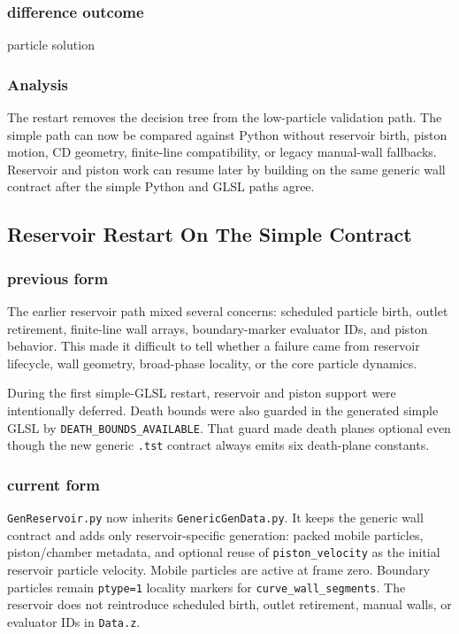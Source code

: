 \subsubsection{difference outcome}

particle solution

\subsubsection{Analysis}

The restart removes the decision tree from the low-particle validation path.
The simple path can now be compared against Python without reservoir birth,
piston motion, CD geometry, finite-line compatibility, or legacy manual-wall
fallbacks.  Reservoir and piston work can resume later by building on the
same generic wall contract after the simple Python and GLSL paths agree.

\subsection{Reservoir Restart On The Simple Contract}

\subsubsection{previous form}

The earlier reservoir path mixed several concerns: scheduled particle birth,
outlet retirement, finite-line wall arrays, boundary-marker evaluator IDs,
and piston behavior.  This made it difficult to tell whether a failure came
from reservoir lifecycle, wall geometry, broad-phase locality, or the core
particle dynamics.

During the first simple-GLSL restart, reservoir and piston support were
intentionally deferred.  Death bounds were also guarded in the generated
simple GLSL by \texttt{DEATH\_BOUNDS\_AVAILABLE}.  That guard made death
planes optional even though the new generic \texttt{.tst} contract always
emits six death-plane constants.

\subsubsection{current form}

\texttt{GenReservoir.py} now inherits \texttt{GenericGenData.py}.  It keeps
the generic wall contract and adds only reservoir-specific generation:
packed mobile particles, piston/chamber metadata, and optional reuse of
\texttt{piston\_velocity} as the initial reservoir particle velocity.  Mobile
particles are active at frame zero.  Boundary particles remain
\texttt{ptype=1} locality markers for \texttt{curve\_wall\_segments}.  The
reservoir does not reintroduce scheduled birth, outlet retirement, manual
walls, or evaluator IDs in \texttt{Data.z}.

